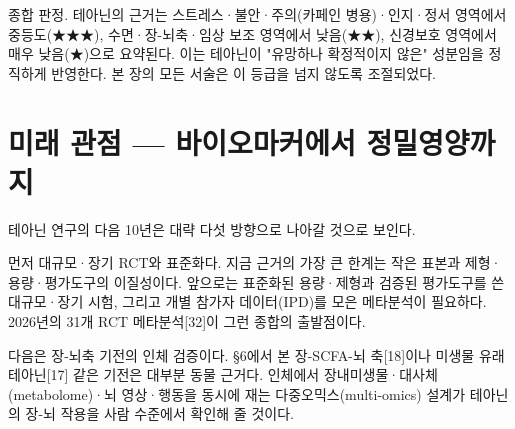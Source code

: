 \documentclass[12pt,oneside]{book}
\begin{document}
\vspace{2pt}\vspace{3pt}

종합 판정. 테아닌의 근거는 스트레스·불안·주의(카페인 병용)·인지·정서 영역에서 중등도(★★★), 수면·장-뇌축·임상 보조 영역에서 낮음(★★), 신경보호 영역에서 매우 낮음(★)으로 요약된다. 이는 테아닌이 "유망하나 확정적이지 않은" 성분임을 정직하게 반영한다. 본 장의 모든 서술은 이 등급을 넘지 않도록 조절되었다.

\section{미래 관점 — 바이오마커에서 정밀영양까지}

테아닌 연구의 다음 10년은 대략 다섯 방향으로 나아갈 것으로 보인다.

먼저 대규모·장기 RCT와 표준화다. 지금 근거의 가장 큰 한계는 작은 표본과 제형·용량·평가도구의 이질성이다. 앞으로는 표준화된 용량·제형과 검증된 평가도구를 쓴 대규모·장기 시험, 그리고 개별 참가자 데이터(IPD)를 모은 메타분석이 필요하다. 2026년의 31개 RCT 메타분석[32]이 그런 종합의 출발점이다.

다음은 장-뇌축 기전의 인체 검증이다. §6에서 본 장-SCFA-뇌 축[18]이나 미생물 유래 테아닌[17] 같은 기전은 대부분 동물 근거다. 인체에서 장내미생물·대사체(metabolome)·뇌 영상·행동을 동시에 재는 다중오믹스(multi-omics) 설계가 테아닌의 장-뇌 작용을 사람 수준에서 확인해 줄 것이다.
\end{document}

